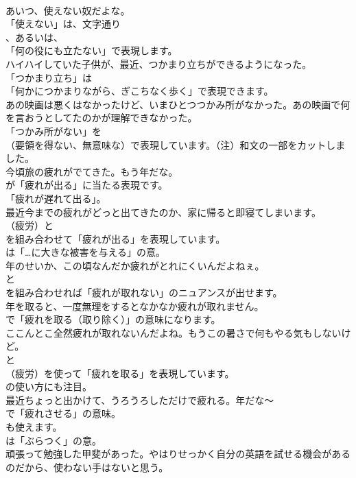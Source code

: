 \documentclass[8pt]{extreport}
\begin{document}
\begin{CJK}{UTF8}{min}
\\	あいつ、使えない奴だよな。 
\\	「使えない」は、文字通り
\\	、あるいは、
\\	「何の役にも立たない」で表現します。	
\\	ハイハイしていた子供が、最近、つかまり立ちができるようになった。 
\\	「つかまり立ち」は
\\	「何かにつかまりながら、ぎこちなく歩く」で表現できます。	
\\	あの映画は悪くはなかったけど、いまひとつつかみ所がなかった。あの映画で何を言おうとしてたのかが理解できなかった。 
\\	「つかみ所がない」を 
\\	（要領を得ない、無意味な）で表現しています。（注）和文の一部をカットしました。	
\\	今頃旅の疲れがでてきた。もう年だな。 
\\	が「疲れが出る」に当たる表現です。
\\	「疲れが遅れて出る」。	
\\	最近今までの疲れがどっと出てきたのか、家に帰ると即寝てしまいます。 
\\	（疲労）と 
\\	を組み合わせて「疲れが出る」を表現しています。
\\	は「…に大きな被害を与える」の意。	
\\	年のせいか、この頃なんだか疲れがとれにくいんだよねぇ。 
\\	と
\\	を組み合わせれば「疲れが取れない」のニュアンスが出せます。	
\\	年を取ると、一度無理をするとなかなか疲れが取れません。 
\\	で「疲れを取る（取り除く）」の意味になります。	
\\	ここんとこ全然疲れが取れないんだよね。もうこの暑さで何もやる気もしないけど。 
\\	と 
\\	（疲労）を使って「疲れを取る」を表現しています。
\\	の使い方にも注目。	
\\	最近ちょっと出かけて、うろうろしただけで疲れる。年だな～ 
\\	で「疲れさせる」の意味。
\\	も使えます。
\\	は「ぶらつく」の意。	
\\	頑張って勉強した甲斐があった。やはりせっかく自分の英語を試せる機会があるのだから、使わない手はないと思う。 

\end{CJK}
\end{document}
